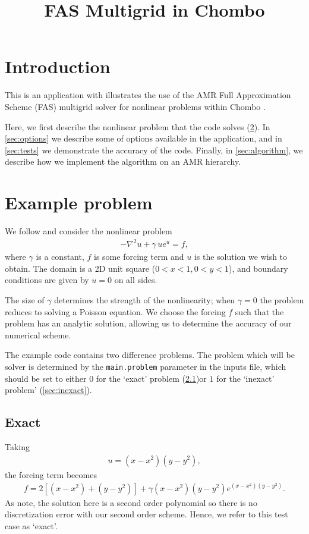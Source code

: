 \documentclass[10pt]{article}
\title{FAS Multigrid in Chombo}
\begin{document}
\maketitle

\section{Introduction}
This is an application with illustrates the use of the AMR Full Approximation Scheme (FAS) multigrid solver for nonlinear problems within Chombo \citep{Chombo}. 

Here, we first describe the nonlinear problem that the code solves (\cref{sec:problem}). In \cref{sec:options} we describe some of options available in the application, and in \cref{sec:tests} we demonstrate the accuracy of the code. Finally, in \cref{sec:algorithm}, we describe how we implement the algorithm on an AMR hierarchy.

\section{Example problem}
\label{sec:problem}
We follow \cite{Henson2002} and consider the nonlinear problem
\begin{align}
- \nabla^2 u + \gamma \, u e^u = f,
\end{align}
where $\gamma$ is a constant, $f$ is some forcing term and $u$ is the solution we wish to obtain. The domain is a 2D unit square ($0<x<1, 0<y<1$), and boundary conditions are given by $u=0$ on all sides. 

The size of $\gamma$ determines the strength of the nonlinearity; when $\gamma=0$ the problem reduces to solving a Poisson equation. We choose the forcing $f$ such that the problem has an analytic solution, allowing us to determine the accuracy of our numerical scheme.

The example code contains two difference problems. The problem which will be solver is determined by the \texttt{main.problem} parameter in the inputs file, which should be set to either $0$ for the `exact' problem (\cref{sec:exact})or $1$ for the `inexact' problem' (\cref{sec:inexact}).

\subsection{Exact}
\label{sec:exact}
Taking 
\begin{align}
u=(x-x^2)(y-y^2),
\end{align}
the forcing term becomes
\begin{align}
f = 2 \left[ (x-x^2) + (y-y^2) \right] + \gamma (x-x^2)(y-y^2) e^{(x-x^2)(y-y^2)}.
\end{align}
As \cite{Henson2002} note, the solution here is a second order polynomial so there is no discretization error with our second order scheme. Hence, we refer to this test case as `exact'.
\end{document}
